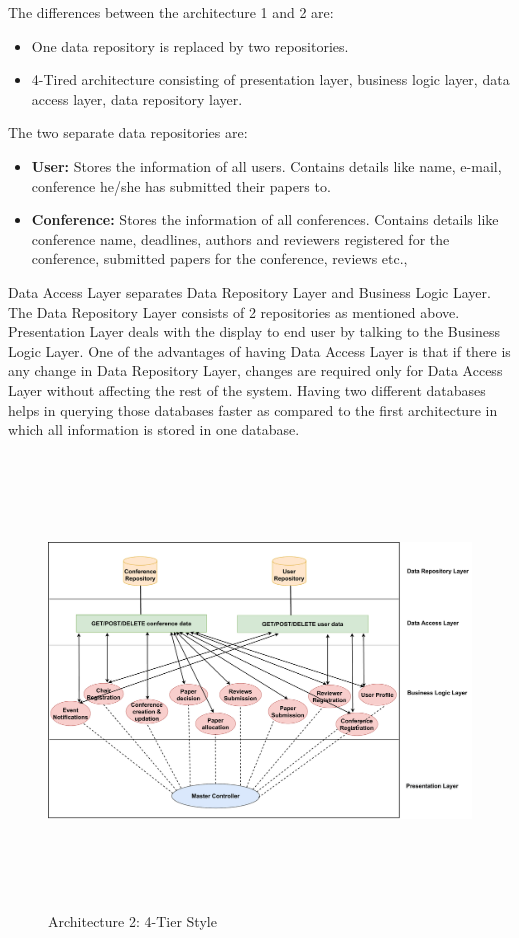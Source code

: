 \documentclass[english,a4paper,12pt]{report}
\begin{document}
The differences between the architecture 1 and 2 are:
\begin{itemize}
    \item One data repository is replaced by two repositories.
    \item 4-Tired architecture consisting of presentation layer, business logic layer, data access layer, data repository layer.
\end{itemize}
The two separate data repositories are:
\begin{itemize}
    \item \textbf{User: }Stores the information of all users. Contains details like name, e-mail, conference he/she has submitted their papers to.
    \item \textbf{Conference: }Stores the information of all conferences. Contains details like conference name, deadlines, authors and reviewers registered for the conference, submitted papers for the conference, reviews etc.,
\end{itemize}
Data Access Layer separates Data Repository Layer and Business Logic Layer. The Data Repository Layer consists of 2 repositories as mentioned above. Presentation Layer deals with the display to end user by talking to the Business Logic Layer. One of the advantages of having Data Access Layer is that if there is any change in Data Repository Layer, changes are required only for Data Access Layer without affecting the rest of the system. Having two different databases helps in querying those databases faster as compared to the first architecture in which all information is stored in one database.


\begin{figure}[h!]
\centering
 \includegraphics[keepaspectratio,width=25cm,height=12cm]{SA-Images/Arch2.pdf}
 \caption{Architecture 2: 4-Tier Style}
\end{figure}
\end{document}
